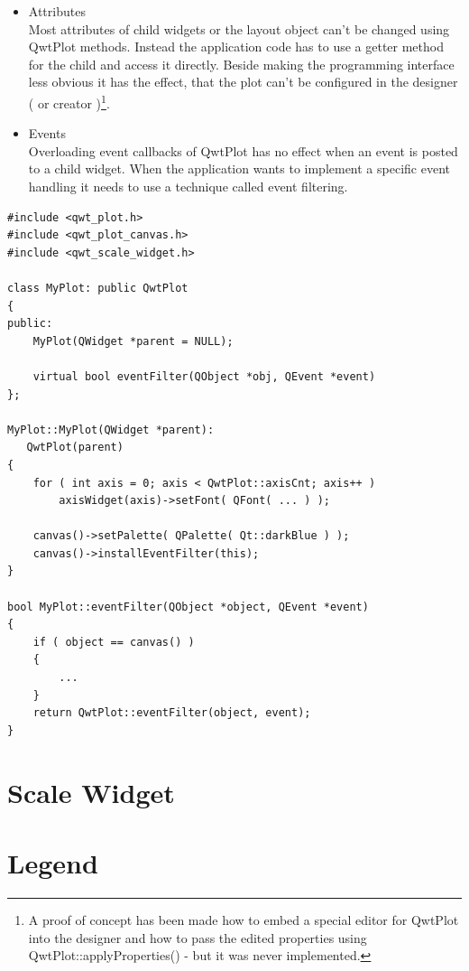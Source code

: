 \documentclass[12pt,a4paper]{book}
\begin{document}
\begin{itemize}

\item Attributes\\
Most attributes of child widgets or the layout object can't be changed using QwtPlot methods. Instead the application code has to use a getter method for the child and access it directly. Beside making the programming interface less obvious it has the effect, that the plot can't be configured in the designer ( or creator )\footnote{A proof of concept has been made how to embed a special editor for QwtPlot into the designer and how to pass the edited properties using QwtPlot::applyProperties() - but it was never implemented.}.

\item Events\\
Overloading event callbacks of QwtPlot has no effect when an event is posted to a child widget. When the application wants to implement a specific event handling it needs to use a technique called event filtering.

\end{itemize}

\begin{lstlisting}
#include <qwt_plot.h>
#include <qwt_plot_canvas.h>
#include <qwt_scale_widget.h>

class MyPlot: public QwtPlot
{
public:
    MyPlot(QWidget *parent = NULL);
    
    virtual bool eventFilter(QObject *obj, QEvent *event)
};

MyPlot::MyPlot(QWidget *parent):
   QwtPlot(parent)
{
    for ( int axis = 0; axis < QwtPlot::axisCnt; axis++ )
    	axisWidget(axis)->setFont( QFont( ... ) );

	canvas()->setPalette( QPalette( Qt::darkBlue ) );
    canvas()->installEventFilter(this);
} 

bool MyPlot::eventFilter(QObject *object, QEvent *event)
{
    if ( object == canvas() )
    {
        ...
    }
    return QwtPlot::eventFilter(object, event);
}
\end{lstlisting}


\section{Scale Widget}
\section{Legend}
\end{document}
